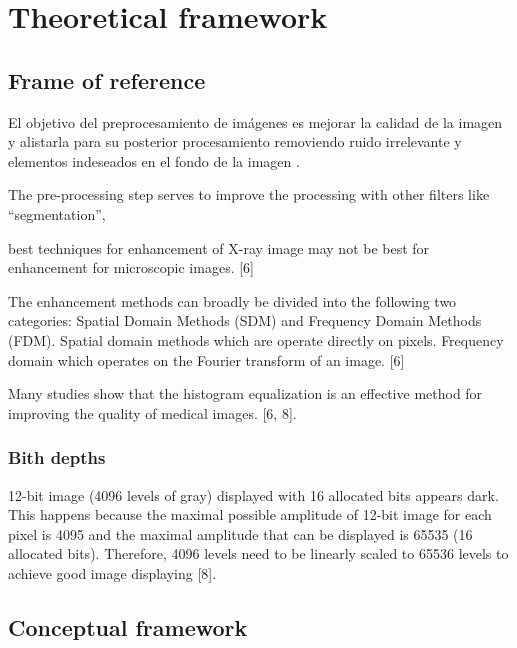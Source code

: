 \chapter{Theoretical framework}

\section{Frame of reference}

El objetivo del preprocesamiento de imágenes es mejorar la calidad de la imagen
y alistarla para su posterior procesamiento removiendo ruido irrelevante y
elementos indeseados en el fondo de la imagen \cite{}.

The pre-processing step serves to improve the processing with other filters
like “segmentation”, 

best techniques for enhancement of X-ray image may not be best for enhancement
for microscopic images. [6]

The enhancement methods can broadly be divided into the following two
categories: Spatial Domain Methods (SDM) and Frequency Domain Methods (FDM).
Spatial domain methods which are operate directly on pixels. Frequency domain
which operates on the Fourier transform of an image. [6]

Many studies show that the histogram equalization is an effective method for
improving the quality of medical images. [6, 8]. 

\subsection{Bith depths}

12-bit image (4096 levels of gray) displayed with 16 allocated bits appears
dark. This happens because the maximal possible amplitude of 12-bit image for
each pixel is 4095 and the maximal amplitude that can be displayed is 65535 (16
allocated bits). Therefore, 4096 levels need to be linearly scaled to 65536
levels to achieve good image displaying [8].


\section{Conceptual framework}


